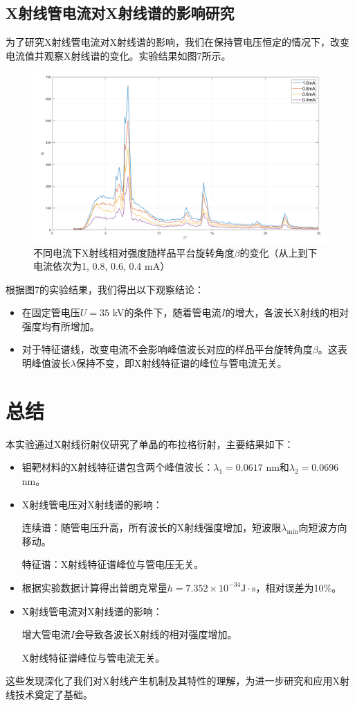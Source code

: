 \documentclass[11pt,a4paper]{article}
\begin{document}
    \subsection{X射线管电流对X射线谱的影响研究}
    为了研究X射线管电流对X射线谱的影响，我们在保持管电压恒定的情况下，改变电流值并观察X射线谱的变化。实验结果如图7所示。
    \begin{figure}[H]
    \centering
    \includegraphics[width=\textwidth]{current.png}
    \captionsetup{font=footnotesize}
    \caption{不同电流下X射线相对强度随样品平台旋转角度$\beta$的变化（从上到下电流依次为1, 0.8, 0.6, 0.4 mA）}
    \end{figure}
    根据图7的实验结果，我们得出以下观察结论：
    \begin{itemize}
    \item 在固定管电压$U=35$ kV的条件下，随着管电流$I$的增大，各波长X射线的相对强度均有所增加。
    \item 对于特征谱线，改变电流不会影响峰值波长对应的样品平台旋转角度$\beta$。这表明峰值波长$\lambda$保持不变，即X射线特征谱的峰位与管电流无关。
    \end{itemize}
    \section{总结}
    本实验通过X射线衍射仪研究了单晶的布拉格衍射，主要结果如下：
    \begin{itemize}
    \item 钼靶材料的X射线特征谱包含两个峰值波长：$\lambda_1=0.0617$ nm和$\lambda_2=0.0696$ nm。
    \item X射线管电压对X射线谱的影响：
    
    连续谱：随管电压升高，所有波长的X射线强度增加，短波限$\lambda_{\min}$向短波方向移动。

    特征谱：X射线特征谱峰位与管电压无关。
    
    \item 根据实验数据计算得出普朗克常量$h=7.352\times10^{-34}\text{J}\cdot\text{s}$，相对误差为10\%。
    \item X射线管电流对X射线谱的影响：
    
    增大管电流$I$会导致各波长X射线的相对强度增加。

    X射线特征谱峰位与管电流无关。
    \end{itemize}
    
    
    这些发现深化了我们对X射线产生机制及其特性的理解，为进一步研究和应用X射线技术奠定了基础。
\end{document}
